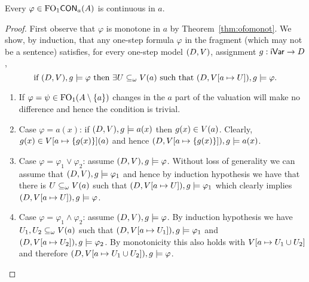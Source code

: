 \begin{lemma}\label{lem:cofoiscont}
Every $\varphi \in \mathrm{FO}_1\mathsf{CON}_{a}(A)$ is continuous in $a$.
\end{lemma}
\begin{proof}
First observe that $\varphi$ is monotone in $a$ by Theorem~\ref{thm:ofomonot}.
We show, by induction, that any one-step formula $\varphi$ in the fragment (which may not be a sentence) satisfies, for every one-step model $(D,V)$, assignment ${g:\mathsf{iVar}\to D}$,
%
\[
\text{if } (D,\val),\ass \models \varphi \text{ then } \exists U \subseteq_\omega \val(a) \text{ such that } (D,\val[a\mapsto U]),\ass \models \varphi.
\]
%
\begin{enumerate}[\textbullet]
\item If ${\varphi = \psi \in \mathrm{FO}_1(A\setminus \{a\})}$ changes in the $a$ part of the valuation will make no difference and hence the condition is trivial. 

\item Case $\varphi = a(x)$: if $(D,V),g \models a(x)$ then $g(x)\in V(a)$. Clearly, $g(x) \in V[a\mapsto \{g(x)\}](a)$ and hence $(D, V[a\mapsto \{g(x)\}]),g \models a(x)$. %

\item Case $\varphi = \varphi_1 \lor \varphi_2$: assume $(D,V),g \models \varphi$. Without loss of generality we can assume that $(D,V),g \models \varphi_1$ and hence by induction hypothesis we have that there is $U \subseteq_\omega V(a)$ such that $(D,V[a\mapsto U]),g \models \varphi_1$ which clearly implies $(D,V[a\mapsto U]),g \models \varphi$. %

\item Case $\varphi = \varphi_1 \land \varphi_2$: assume $(D,V),g \models \varphi$. By induction hypothesis we have $U_1,U_2 \subseteq_\omega V(a)$ such that $(D,V[a\mapsto U_1]),g \models \varphi_1$ and $(D,V[a\mapsto U_2]),g \models \varphi_2$. By monotonicity this also holds with $V[a\mapsto U_1 \cup U_2]$ and therefore $(D,V[a\mapsto U_1 \cup U_2]),g \models \varphi$. %


\end{enumerate}
\end{proof}

